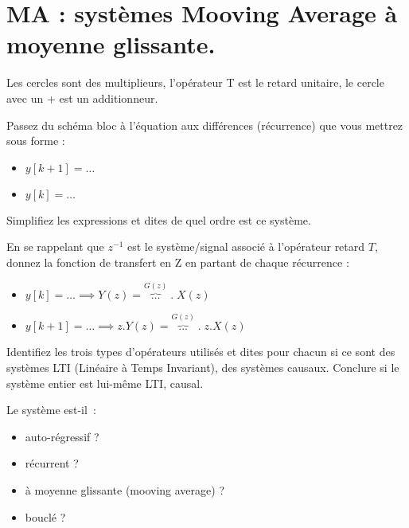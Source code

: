 


 \section{MA : systèmes Mooving Average à moyenne glissante.}


 


Les cercles sont des multiplieurs, l'opérateur T est le retard unitaire, le cercle avec un + est un additionneur.





Passez du schéma bloc à l'équation aux différences (récurrence) que vous mettrez sous forme :  
\begin{itemize}
\item $y[k+1]=\ldots$  
\item $y[k]=\ldots$  
\end{itemize}
Simplifiez les expressions et dites de quel ordre est ce système.  




En se rappelant que $z^{-1}$ est le système/signal associé à
l'opérateur retard $T$, donnez la fonction de transfert en Z en
partant de chaque récurrence :
\begin{itemize}
\item $y[k]=\ldots \implies Y(z) = \overbrace{\ldots}^{G(z)} \;.\; X(z) $  
\item $y[k+1]=\ldots \implies z.Y(z) =  \overbrace{\ldots}^{G(z)} \;.\; z.X(z)$
\end{itemize}




Identifiez les trois types d'opérateurs utilisés et dites pour chacun
si ce sont des systèmes LTI (Linéaire à Temps Invariant), des systèmes
causaux.  Conclure si le système entier est lui-même LTI, causal.

Le système est-il~:
\begin{itemize}
\item auto-régressif ?
\item récurrent ?
\item à moyenne glissante (mooving
  average) ?
\item bouclé ?
\end{itemize}





